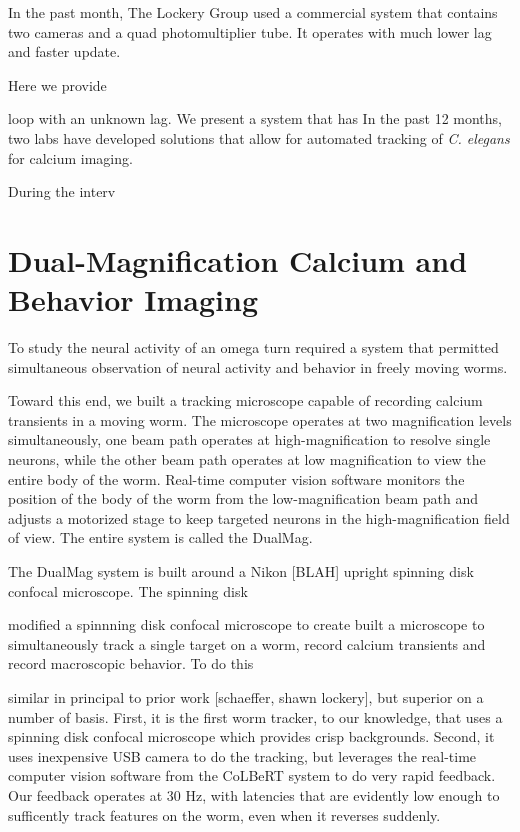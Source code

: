 In the past month,  The Lockery Group used a commercial system  that contains two cameras and a quad photomultiplier tube. It operates with much lower lag and faster update. 

Here we provide 



loop with an unknown lag. 
\citep{faumont_image-free_2011}
We present a system that has 
In the past 12 months, two labs have developed solutions that allow for automated tracking of \textit{C. elegans} for calcium imaging. 
 



During the interv


\section{Dual-Magnification Calcium and Behavior Imaging}
To study the neural activity of an omega turn required a system that permitted simultaneous observation of neural activity and behavior in freely moving worms.  



Toward this end, we built a tracking microscope capable of recording calcium transients in a moving worm. The microscope operates at two magnification levels simultaneously, one beam path operates at high-magnification to resolve single neurons, while the other beam path operates at low  magnification to view the entire body of the worm. Real-time computer vision software monitors the position of the body of the worm from the low-magnification beam path and adjusts a motorized stage to keep targeted neurons in the high-magnification field of view. The entire system is called the DualMag.



The DualMag system is built around a Nikon [BLAH] upright spinning disk confocal microscope. The spinning disk  




 modified a spinnning disk confocal microscope to create 
built a microscope to simultaneously track a single target on a worm, record calcium transients and record macroscopic behavior. To do this 

similar in principal to prior work [schaeffer, shawn lockery], but superior on a number of basis. First, it is the first worm tracker, to our knowledge, that uses a  spinning disk confocal microscope which provides crisp backgrounds. Second, it uses inexpensive USB camera to do the tracking, but leverages the real-time computer vision software from the CoLBeRT system to do very rapid feedback. Our feedback operates at 30 Hz, with latencies that are evidently low enough to sufficently track features on the worm, even when it reverses suddenly. 


